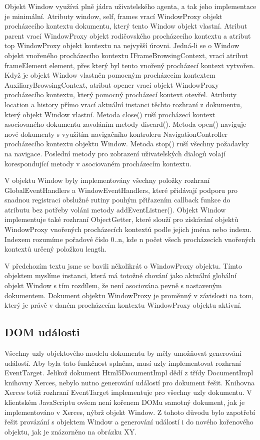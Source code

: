 Objekt Window využívá plně jádra uživatelského agenta, a tak jeho implementace je minimální. Atributy window, self, frames vrací WindowProxy objekt procházecího kontextu dokumentu, který tento Window objekt vlastní. Atribut parent vrací WindowProxy objekt rodičovského procházecího kontextu a atribut top WindowProxy objekt kontextu na nejvyšší úrovni. Jedná-li se o Window objekt vnořeného procházecího kontextu IFrameBrowsingContext, vrací atribut frameElement element, přes který byl tento vnořený procházecí kontext vytvořen. Když je objekt Window vlastněn pomocným procházecím kontextem AuxiliaryBrowsingContext, atribut opener vrací objekt WindowProxy procházecího kontextu, který pomocný procházecí kontext otevřel. Atributy location a history přímo vrací aktuální instanci těchto rozhraní z dokumentu, který objekt Window vlastní. Metoda close() ruší procházecí kontext asociovaného dokumentu zavoláním metody discard(). Metoda open() naviguje nové dokumenty s využitím navigačního kontroleru NavigationController procházecího kontextu objektu Window. Metoda stop() ruší všechny požadavky na navigace. Poslední metody pro zobrazení uživatelských dialogů volají korespondující metody v asociovaném procházecím kontextu. 

V objektu Window byly implementovány všechny položky rozhraní GlobalEventHandlers a WindowEventHandlers, které přidávají podporu pro snadnou registraci obslužné rutiny pouhým přiřazením callback funkce do atributu bez potřeby voláni metody addEventListner(). Objekt Window implementuje také rozhraní ObjectGetter, které slouží pro získávání objektů WindowProxy vnořených procházecích kontextů podle jejich jména nebo indexu. Indexem rozumíme pořadové číslo 0..n, kde n počet všech procházecích vnořených kontextů určený položkou length.

V předchozím textu jsme se bavili několikrát o WindowProxy objektu. Tímto objektem myslíme instanci, která má totožné chování jako aktuální globální objekt Window s tím rozdílem, že není asociována pevně s nastaveným dokumentem. Dokument objektu WindowProxy je proměnný v závislosti na tom, který je právě v daném procházecím kontextu WindowProxy objektu aktivní. 

\subsection{DOM události}
\label{Chapter.Implementation.DOMEvents}

Všechny uzly objektového modelu dokumentu by měly umožňovat generování událostí. Aby byla tato funkčnost splněna, musí uzly implementovat rozhraní EventTarget. Jelikož dokument Html5DocumentImpl dědí z třídy DocumentImpl knihovny Xerces, nebylo nutno generování událostí pro dokument řešit. Knihovna Xerces totiž rozhraní EventTarget implementuje pro všechny uzly dokumentu. V klientském JavaScriptu ovšem není kořenem DOMu samotný dokument, jak je implementováno v Xerces, nýbrž objekt Window. Z tohoto důvodu bylo zapotřebí řešit provázání s objektem Window a generování událostí i do nového kořenového objektu, jak je znázorněno na obrázku XY. 


